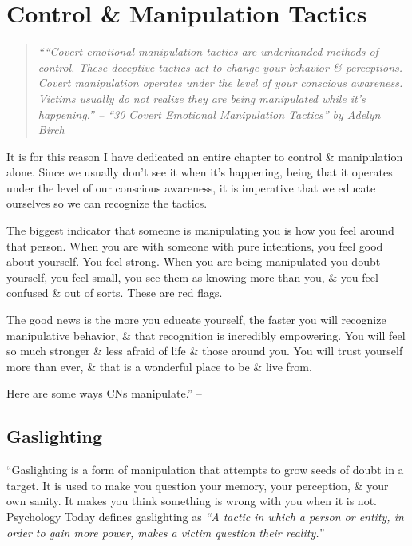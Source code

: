 \documentclass{article}
\numberwithin{equation}{section}
\begin{document}

\section{Control \& Manipulation Tactics}

\begin{quotation}\it
	````Covert emotional manipulation tactics are underhanded methods of control. These deceptive tactics act to change your behavior \& perceptions. Covert manipulation operates under the level of your conscious awareness. Victims usually do not realize they are being manipulated while it's happening.'' -- ``30 Covert Emotional Manipulation Tactics'' \emph{by Adelyn Birch}
\end{quotation}
It is for this reason I have dedicated an entire chapter to control \& manipulation alone. Since we usually don't see it when it's happening, being that it operates under the level of our conscious awareness, it is imperative that we educate ourselves so we can recognize the tactics.

The biggest indicator that someone is manipulating you is how you feel around that person. When you are with someone with pure intentions, you feel good about yourself. You feel strong. When you are being manipulated you doubt yourself, you feel small, you see them as knowing more than you, \& you feel confused \& out of sorts. These are red flags.

The good news is the more you educate yourself, the faster you will recognize manipulative behavior, \& that recognition is incredibly empowering. You will feel so much stronger \& less afraid of life \& those around you. You will trust yourself more than ever, \& that is a wonderful place to be \& live from.

Here are some ways CNs manipulate.'' -- \cite[p. 73]{Mirza2017}

\subsection{Gaslighting}
``Gaslighting is a form of manipulation that attempts to grow seeds of doubt in a target. It is used to make you question your memory, your perception, \& your own sanity. It makes you think something is wrong with you when it is not. Psychology Today defines gaslighting as \textit{``A tactic in which a person or entity, in order to gain more power, makes a victim question their reality.''}
\end{document}
